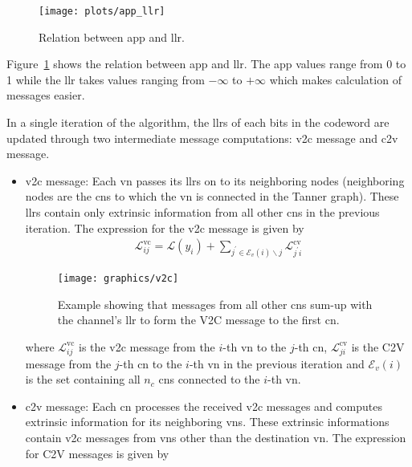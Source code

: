 \begin{figure}[htbp]
  \centering
  \texttt{[image: plots/app\_llr]}
  \caption{Relation between \gls{app} and \gls{llr}.}
  \label{fig:app_llr}
\end{figure}

Figure~\ref{fig:app_llr} shows the relation between \gls{app} and \gls{llr}. The \gls{app} values range from 0 to 1 while the \gls{llr} takes values ranging from $-\infty$ to $+\infty$ which makes calculation of messages easier.

In a single iteration of the algorithm, the \glspl{llr} of each bits in the codeword are updated through two intermediate message computations: \gls{v2c} message and \gls{c2v} message.
\begin{itemize}
  \item \gls{v2c} message: Each \gls{vn} passes its \glspl{llr} on to its neighboring nodes (neighboring nodes are the \glspl{cn} to which the \gls{vn} is connected in the Tanner graph). These \glspl{llr} contain only extrinsic information from all other \glspl{cn} in the previous iteration. The expression for the \gls{v2c} message is given by~\cite{Hagenauer1996}
  \begin{align}
    \mathcal{L}^{\mathrm{vc}}_{ij}=\mathcal{L}(y_i)+\sum_{j^\prime\in\mathcal{E}_v(i)\backslash j} \mathcal{L}^{\mathrm{cv}}_{j^\prime i}
  \end{align}
  \begin{figure}[htbp]
    \centering
    \texttt{[image: graphics/v2c]}
    \caption{Example showing that messages from all other \glspl{cn} sum-up with the channel's \gls{llr} to form the V2C message to the first \gls{cn}.}
    \label{fig:v2c}
  \end{figure}
  where $\mathcal{L}^{\mathrm{vc}}_{ij}$ is the \gls{v2c} message from the $i$-th \gls{vn} to the $j$-th \gls{cn}, $\mathcal{L}^{\mathrm{cv}}_{ji}$ is the C2V message from the $j$-th \gls{cn} to the $i$-th \gls{vn} in the previous iteration and $\mathcal{E}_v(i)$ is the set containing  all $n_c$ \glspl{cn} connected to the $i$-th \gls{vn}.
  \item \gls{c2v} message: Each \gls{cn} processes the received \gls{v2c} messages and computes extrinsic information for its neighboring \glspl{vn}. These extrinsic informations contain \gls{v2c} messages from \glspl{vn} other than the destination \gls{vn}. The expression for C2V messages is given by~\cite{Hagenauer1996}

\end{itemize}
